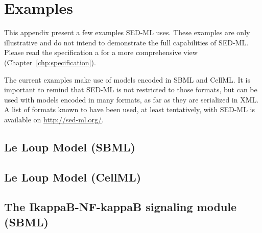 \chapter{Examples}

This appendix present a few examples SED-ML uses. These examples are only illustrative and do not intend to demonstrate the full capabilities of SED-ML. Please read the specification a for a more comprehensive view (Chapter~\ref{chp:specification}). 

The current examples make use of models encoded in SBML and CellML. It is important to remind that SED-ML is not restricted to those formats, but can be used with models encoded in many formats, as far as they are serialized in XML. A list of formats known to have been used, at least tentatively, with SED-ML is available on \url{http://sed-ml.org/}.

\section{Le Loup Model (SBML)}


\section{Le Loup Model (CellML)}


\newpage
\section{The IkappaB-NF-kappaB signaling module (SBML)}
